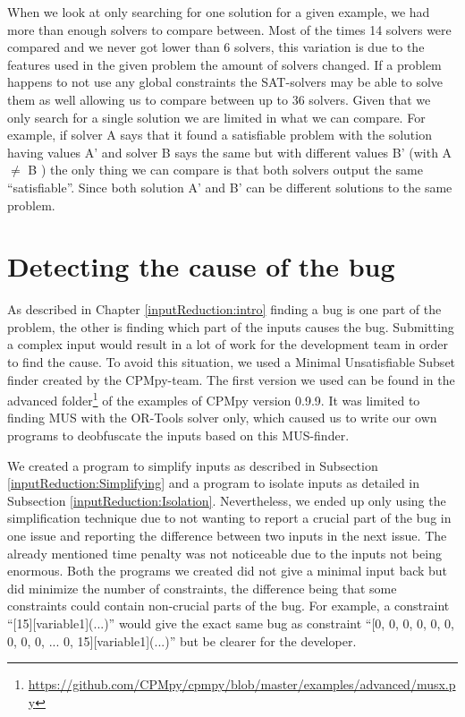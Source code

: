 When we look at only searching for one solution for a given example, we had more than enough solvers to compare between. Most of the times 14 solvers were compared and we never got lower than 6 solvers, this variation is due to the features used in the given problem the amount of solvers changed. If a problem happens to not use any global constraints the SAT-solvers may be able to solve them as well allowing us to compare between up to 36 solvers. Given that we only search for a single solution we are limited in what we can compare. For example, if solver A says that it found a satisfiable problem with the solution having values A' and solver B says the same but with different values B' (with A $\neq$ B ) the only thing we can compare is that both solvers output the same “satisfiable”. Since both solution A' and B' can be different solutions to the same problem.


\section{Detecting the cause of the bug}
\label{impl:DetectingCause}
As described in Chapter \ref{inputReduction:intro} finding a bug is one part of the problem, the other is finding which part of the inputs causes the bug. Submitting a complex input would result in a lot of work for the development team in order to find the cause. To avoid this situation, we used a Minimal Unsatisfiable Subset finder created by the CPMpy-team. The first version we used can be found in the advanced folder\footnote{\url{https://github.com/CPMpy/cpmpy/blob/master/examples/advanced/musx.py}} of the examples of CPMpy version 0.9.9. It was limited to finding MUS with the OR-Tools solver only, which caused us to write our own programs to deobfuscate the inputs based on this MUS-finder. 

We created a program to simplify inputs as described in Subsection \ref{inputReduction:Simplifying} and a program to isolate inputs as detailed in Subsection \ref{inputReduction:Isolation}. Nevertheless, we ended up only using the simplification technique due to not wanting to report a crucial part of the bug in one issue and reporting the difference between two inputs in the next issue. The already mentioned time penalty was not noticeable due to the inputs not being enormous. Both the programs we created did not give a minimal input back but did minimize the number of constraints, the difference being that some constraints could contain non-crucial parts of the bug. For example, a constraint “[15][variable1](...)” would give the exact same bug as constraint “[0, 0, 0, 0, 0, 0, 0, 0, 0, ... 0, 15][variable1](...)” but be clearer for the developer. 

